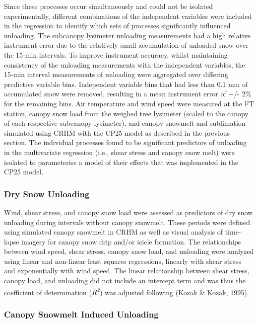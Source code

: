 \documentclass[
]{agujournal2019}
\begin{document}
Since these processes occur simultaneously and could not be isolated
experimentally, different combinations of the independent variables were
included in the regression to identify which sets of processes
significantly influenced unloading. The subcanopy lysimeter unloading
measurements had a high relative instrument error due to the relatively
small accumulation of unloaded snow over the 15-min intervals. To
improve instrument accuracy, whilst maintaining consistency of the
unloading measurements with the independent variables, the 15-min
interval measurements of unloading were aggregated over differing
predictive variable bins. Independent variable bins that had less than
0.1 mm of accumulated snow were removed, resulting in a mean instrument
error of +/- 2\% for the remaining bins. Air temperature and wind speed
were measured at the FT station, canopy snow load from the weighed tree
lysimeter (scaled to the canopy of each respective subcanopy lysimeter),
and canopy snowmelt and sublimation simulated using CRHM with the CP25
model as described in the previous section. The individual processes
found to be significant predictors of unloading in the multivariate
regression (i.e., shear stress and canopy snow melt) were isolated to
parameterise a model of their effects that was implemented in the CP25
model.

\subsubsection{Dry Snow Unloading}\label{dry-snow-unloading}

Wind, shear stress, and canopy snow load were assessed as predictors of
dry snow unloading during intervals without canopy snowmelt. These
periods were defined using simulated canopy snowmelt in CRHM as well as
visual analysis of time-lapse imagery for canopy snow drip and/or icicle
formation. The relationships between wind speed, shear stress, canopy
snow load, and unloading were analyzed using linear and non-linear least
squares regressions, linearly with shear stress and exponentially with
wind speed. The linear relationship between shear stress, canopy load,
and unloading did not include an intercept term and was thus the
coefficient of determination (\emph{R\textsuperscript{2}}) was adjusted
following (Kozak \& Kozak, 1995).

\subsubsection{Canopy Snowmelt Induced
Unloading}\label{canopy-snowmelt-induced-unloading}
\end{document}
